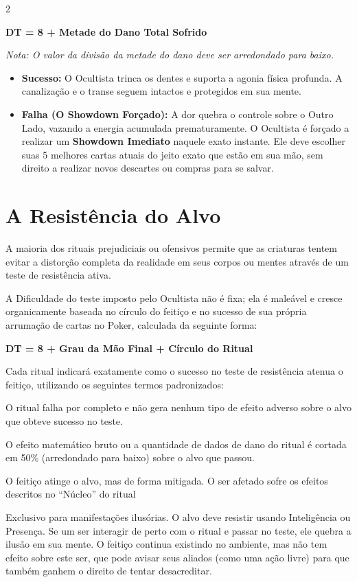 \documentclass[a4paper,11pt,openany]{book}
\begin{document}
\begin{multicols}{2}
\begin{regra}
\centering
\Large\bfseries DT = 8 + Metade do Dano Total Sofrido
\end{regra}
\textit{Nota: O valor da divisão da metade do dano deve ser arredondado para baixo.}

\begin{itemize}
    \item \textbf{Sucesso:} O Ocultista trinca os dentes e suporta a agonia física profunda. A canalização e o transe seguem intactos e protegidos em sua mente.
    \item \textbf{Falha (O Showdown Forçado):} A dor quebra o controle sobre o Outro Lado, vazando a energia acumulada prematuramente. O Ocultista é forçado a realizar um \textbf{Showdown Imediato} naquele exato instante. Ele deve escolher suas 5 melhores cartas atuais do jeito exato que estão em sua mão, sem direito a realizar novos descartes ou compras para se salvar.
\end{itemize}

\section{A Resistência do Alvo}

A maioria dos rituais prejudiciais ou ofensivos permite que as criaturas tentem evitar a distorção completa da realidade em seus corpos ou mentes através de um teste de resistência ativa.

A Dificuldade do teste imposto pelo Ocultista não é fixa; ela é maleável e cresce organicamente baseada no círculo do feitiço e no sucesso de sua própria arrumação de cartas no Poker, calculada da seguinte forma:

\begin{regra}
\centering
\Large\bfseries DT = 8 + Grau da Mão Final + Círculo do Ritual
\end{regra}

Cada ritual indicará exatamente como o sucesso no teste de resistência atenua o feitiço, utilizando os seguintes termos padronizados:

\begin{description}[font=\sffamily\bfseries\color{CodexRed}]
    \item[Anula:] O ritual falha por completo e não gera nenhum tipo de efeito adverso sobre o alvo que obteve sucesso no teste.
    \item[Reduz à Metade:] O efeito matemático bruto ou a quantidade de dados de dano do ritual é cortada em 50\% (arredondado para baixo) sobre o alvo que passou.
    \item[Parcial:] O feitiço atinge o alvo, mas de forma mitigada. O ser afetado sofre os efeitos descritos no ``Núcleo'' do ritual
    \item[Desacredita:] Exclusivo para manifestações ilusórias. O alvo deve resistir usando Inteligência ou Presença. Se um ser interagir de perto com o ritual e passar no teste, ele quebra a ilusão em sua mente. O feitiço continua existindo no ambiente, mas não tem efeito sobre este ser, que pode avisar seus aliados (como uma ação livre) para que também ganhem o direito de tentar desacreditar.
\end{description}


\end{multicols}
\end{document}
